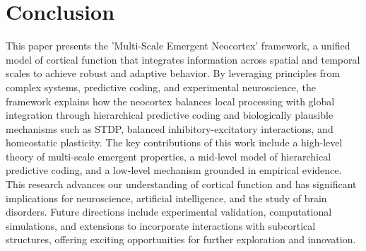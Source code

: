 \documentclass{article}
\begin{document}
\section{Conclusion}
This paper presents the 'Multi-Scale Emergent Neocortex' framework, a unified model of cortical function that integrates information across spatial and temporal scales to achieve robust and adaptive behavior. By leveraging principles from complex systems, predictive coding, and experimental neuroscience, the framework explains how the neocortex balances local processing with global integration through hierarchical predictive coding and biologically plausible mechanisms such as STDP, balanced inhibitory-excitatory interactions, and homeostatic plasticity. The key contributions of this work include a high-level theory of multi-scale emergent properties, a mid-level model of hierarchical predictive coding, and a low-level mechanism grounded in empirical evidence. This research advances our understanding of cortical function and has significant implications for neuroscience, artificial intelligence, and the study of brain disorders. Future directions include experimental validation, computational simulations, and extensions to incorporate interactions with subcortical structures, offering exciting opportunities for further exploration and innovation.
\end{document}
